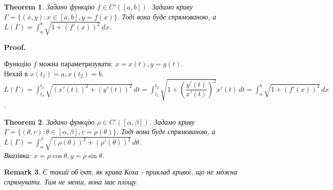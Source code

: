 \documentclass[a4paper, 10pt]{article}
\makeatletter
\def\huge{\displaystyle}
\def\qed{$\blacksquare$}
\theoremstyle{theoremdd}
\newtheorem{theorem}{Theorem}[subsection]
\theoremstyle{theoremdd}
\theoremstyle{theoremdd}
\theoremstyle{theoremdd}
\theoremstyle{theoremdd}
\theoremstyle{theoremdd}
\theoremstyle{theoremdd}
\newtheorem{remark}[theorem]{Remark}
\theoremstyle{theoremdd}
\theoremstyle{theoremdd}
\renewenvironment{proof}[1][Proof.\\]{\par
\pushQED{\hfill \qed}%
\normalfont \topsep6\p@\@plus6\p@\relax
\trivlist
\item\relax
{\bfseries
#1\@addpunct{.}}\hspace\labelsep\ignorespaces
}{%
\popQED\endtrivlist\@endpefalse
}
\makeatother
\begin{document}
\begin{theorem}
Задано функцію $f \in C'([a,b])$. Задамо криву $\Gamma = \{(x,y): x \in [a,b], y = f(x) \}$. Тоді вона буде спрямованою, а $L(\Gamma) = \huge\int_a^b \sqrt{1+(f'(x))^2}\,dx$.
\end{theorem}

\begin{proof}
Функцію $f$ можна параметризувати: $x = x(t), y = y(t)$.\\
Нехай в $x(t_1) = a, x(t_2) = b$.\\
$L(\Gamma) = \huge\int_{t_1}^{t_2} \sqrt{(x'(t))^2 + (y'(t))^2}\,dt = \int_{t_1}^{t_2} \sqrt{1 + \left(\dfrac{y'(t)}{x'(t)}\right)^2} x'(t)\,dt = \int_a^b \sqrt{1+(f'(x))^2}\,dx$.
\end{proof}

\begin{theorem}
Задано функцію $\rho \in C'([\alpha,\beta])$. Задамо криву $\Gamma = \{ (\theta,r): \theta \in [\alpha,\beta], r = \rho (\theta) \}$. Тоді вона буде спрямованою, а $L(\Gamma) = \huge\int_{\alpha}^{\beta} \sqrt{(\rho (\theta))^2 + (\rho'(\theta))^2}\,d\theta$.\\
\textit{Вказівка: $x = \rho \cos \theta, y = \rho \sin \theta$}.
\end{theorem}

\begin{remark}
Є такий об'єкт, як крива Коха - приклад кривої, що не можна спрямувати. Тим не менш, вона має площу.
\end{remark}
\end{document}
